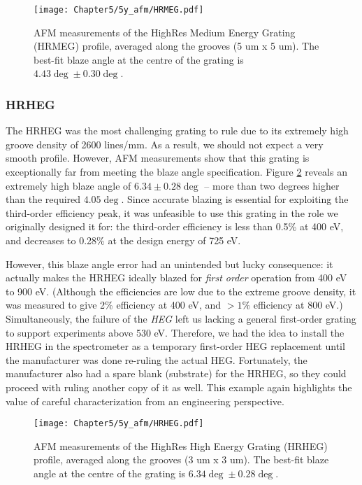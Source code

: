 \begin{figure}[htbp] %
   \centering
   \texttt{[image: Chapter5/5y\_afm/HRMEG.pdf]} 
   \caption{AFM measurements of the HighRes Medium Energy Grating (HRMEG) profile, averaged along the grooves (5 um x 5 um).  The best-fit blaze angle at the centre of the grating is $4.43\deg \pm 0.30\deg$.}
   \label{5y-hrmeg}
\end{figure}

\subsubsection{HRHEG}
The HRHEG was the most challenging grating to rule due to its extremely high groove density of 2600 lines/mm.  As a result, we should not expect a very smooth profile.  However, AFM measurements show that this grating is exceptionally far from meeting the blaze angle specification.  Figure \ref{5y-hrheg} reveals an extremely high blaze angle of $6.34 \pm 0.28\deg$ -- more than two degrees higher than the required $4.05\deg$.  Since accurate blazing is essential for exploiting the third-order efficiency peak, it was unfeasible to use this grating in the role we originally designed it for: the third-order efficiency is less than 0.5\% at 400 eV, and decreases to 0.28\% at the design energy of 725 eV.

However, this blaze angle error had an unintended but lucky consequence: it actually makes the HRHEG ideally blazed for \emph{first order} operation from 400 eV to 900 eV.  (Although the efficiencies are low due to the extreme groove density, it was measured to give 2\% efficiency at 400 eV, and $>1\%$ efficiency at 800 eV.)  Simultaneously, the failure of the \emph{HEG} left us lacking a general first-order grating to support experiments above 530 eV.  Therefore, we had the idea to install the HRHEG in the spectrometer as a temporary first-order HEG replacement until the manufacturer was done re-ruling the actual HEG.  Fortunately, the manufacturer also had a spare blank (substrate) for the HRHEG, so they could proceed with ruling another copy of it as well.  This example again highlights the value of careful characterization from an engineering perspective.

\begin{figure}[htbp] %
   \centering
   \texttt{[image: Chapter5/5y\_afm/HRHEG.pdf]} 
   \caption{AFM measurements of the HighRes High Energy Grating (HRHEG) profile, averaged along the grooves (3 um x 3 um).  The best-fit blaze angle at the centre of the grating is $6.34\deg \pm 0.28\deg$.}
   \label{5y-hrheg}
\end{figure}
